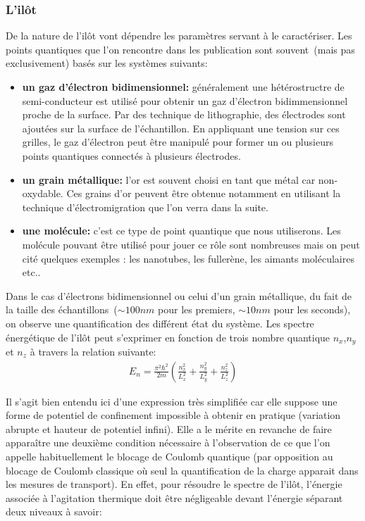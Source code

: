 \subsubsection{L'il\^ot}
De la nature de l'il\^ot vont dépendre les paramètres servant à le caractériser. Les points quantiques que l'on rencontre dans les publication sont souvent~(mais pas exclusivement) basés sur les systèmes suivants:
\begin{itemize}
\item \textbf{un gaz d'électron bidimensionnel:} généralement une hétérostructre de semi-conducteur est utilisé pour obtenir un gaz d'électron bidimmensionnel proche de la surface. Par des technique de lithographie, des électrodes sont ajoutées sur la surface de l'échantillon. En appliquant une tension sur ces grilles, le gaz d'électron peut \^etre manipulé pour former un ou plusieurs points quantiques connectés à plusieurs électrodes.
\item \textbf{un grain métallique:} l'or est souvent choisi en tant que métal car non-oxydable. Ces grains d'or peuvent \^etre obtenue notamment en utilisant la technique d'électromigration que l'on verra dans la suite.
\item \textbf{une molécule:} c'est ce type de point quantique que nous utiliserons. Les molécule pouvant \^etre utilisé pour jouer ce r\^ole sont nombreuses mais on peut cité quelques exemples : les nanotubes, les fullerène, les aimants moléculaires etc.. \newline
\end{itemize}

Dans le cas d'électrons bidimensionnel ou celui d'un grain métallique, du fait de la taille des échantillons~($\sim 100nm$ pour les premiers, $\sim 10nm$ pour les seconds), on observe une quantification des différent état du système. Les spectre énergétique de l'il\^ot peut s'exprimer en fonction de trois nombre quantique $n_x$,$n_y$ et $n_z$ à travers la relation suivante:
\begin{eqnarray}
E_n = \frac{\pi^2 \hbar^2}{2m}(\frac{n_x^2}{L_x^2} + \frac{n_y^2}{L_y^2} + \frac{n_z^2}{L_z^2}) \nonumber
\end{eqnarray}


Il s'agit bien entendu ici d'une expression très simplifiée car elle suppose une forme de potentiel de confinement impossible à obtenir en pratique (variation abrupte et hauteur de potentiel infini). Elle a le mérite en revanche de faire appara\^itre une deuxième condition nécessaire à l'observation de ce que l'on appelle habituellement le blocage de Coulomb quantique (par opposition au blocage de Coulomb classique où seul la quantification de la charge apparait dans les mesures de transport). En effet, pour résoudre le spectre de l'il\^ot, l'énergie associée à l'agitation thermique doit \^etre négligeable devant l'énergie séparant deux niveaux à savoir:


